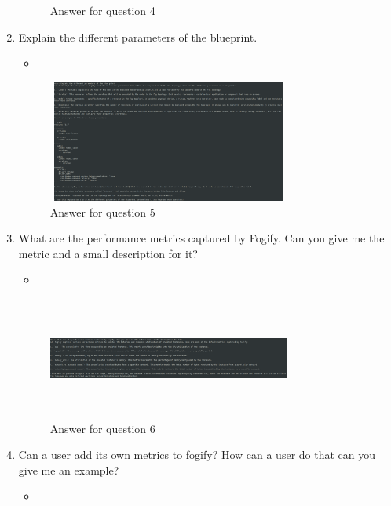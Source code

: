 \begin{enumerate}
\begin{figure}[h!]
              \caption[Methodology pipline]{Answer for question 4}
              \label{img:q4}
          \end{figure}
    \item Explain the different parameters of the blueprint.
          \begin{itemize}
              \item
          \end{itemize}
          \begin{figure}[h!]
              \includegraphics[width=8cm,height=4cm]{figures/q5.png}
              \caption[Methodology pipline]{Answer for question 5}
              \label{img:q5}
          \end{figure}
    \item What are the performance metrics captured by Fogify. Can you give me
          the metric and a small description for it?
          \begin{itemize}
              \item
          \end{itemize}
          \begin{figure}[h!]
              \includegraphics[width=8cm,height=4cm]{figures/q6.png}
              \caption[Methodology pipline]{Answer for question 6}
              \label{img:q6}
          \end{figure}
    \item Can a user add its own metrics to fogify? How can a user do that can
          you give me an example?
          \begin{itemize}
              \item
          \end{itemize}
          \begin{figure}[h!]

\end{figure}
\end{enumerate}
